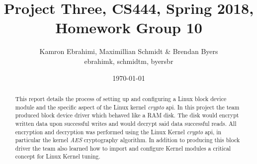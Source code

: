 \documentclass[10pt,onecolumn,draftclsnofoot]{IEEEtran} %
\title{ Project Three, CS444, Spring 2018, Homework Group 10}
\author{Kamron Ebrahimi, Maximillian Schmidt \& Brendan Byers \\ ebrahimk, schmidtm, byersbr }
\date{\today}
\begin{document}
\begin{titlingpage}
\maketitle
\begin{abstract}
\begin{singlespace}
This report details the process of setting up and configuring a Linux block device module and the specific aspect of the Linux kernel \textit{crypto} api. In this project the team produced block device driver which behaved like a RAM  disk. The disk would encrypt written data upon successful writes and would decrypt said data successful reads. All encryption and decryption was performed using the Linux Kernel \textit{crypto} api, in particular the kernel \textit{AES} cryptography algorithm. In addition to producing this block driver the team also learned how to import and configure Kernel modules a critical concept for Linux Kernel tuning. 
\end{singlespace}
\end{abstract}
\end{titlingpage}


\tableofcontents
\end{document}
